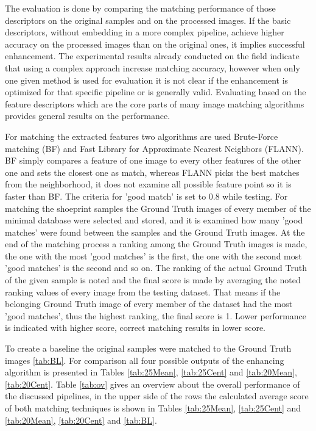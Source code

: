 \documentclass[draft,final]{vutinfth} %
\begin{document}
The evaluation is done by comparing the matching performance of those descriptors on the original samples and on the processed images.
If the basic descriptors, without embedding in a more complex pipeline, achieve higher accuracy on the processed  images than on the original ones, it implies successful enhancement.
The experimental results already conducted on the field indicate \cite{rida2019forensic} that using a complex approach increase matching accuracy, however when only one given method is used for evaluation it is not clear if the enhancement is optimized for that specific pipeline or is generally valid.
Evaluating based on the feature descriptors which are the core parts of many image matching algorithms provides general results on the performance.
\par
For matching the extracted features two algorithms are used Brute-Force matching (BF) and Fast Library for Approximate Nearest Neighbors (FLANN).
BF simply compares a feature of one image to every other features of the other one and sets the closest one as match, whereas FLANN picks the best matches from the neighborhood, it does not examine all possible feature point so it is faster than BF.
The criteria for 'good match' is set to 0.8 while testing.
For matching the shoeprint samples the Ground Truth images of every member of the minimal database were selected and stored, and it is examined how many 'good matches' were found between the samples and the Ground Truth images.
At the end of the matching process a ranking among the Ground Truth images is made, the one with the most 'good matches' is the first, the one with the second most 'good matches' is the second and so on.
The ranking of the actual Ground Truth of the given sample is noted and the final score is made by averaging the noted ranking values  of every image from the testing dataset.
That means if the belonging Ground Truth image of every member of the dataset had the most 'good matches', thus the highest ranking, the final score is 1.
Lower performance is indicated with higher score, correct matching results in lower score.
\par
To create a baseline the original samples were matched to the Ground Truth images \ref{tab:BL}.
For comparison all four possible outputs of the enhancing algorithm is presented in Tables \ref{tab:25Mean}, \ref{tab:25Cent} and \ref{tab:20Mean}, \ref{tab:20Cent}.
Table \ref{tab:ov} gives an overview about the overall performance of the discussed pipelines, in the upper side of the rows the calculated average score of both matching techniques is shown in Tables \ref{tab:25Mean}, \ref{tab:25Cent} and \ref{tab:20Mean}, \ref{tab:20Cent} and \ref{tab:BL}.
\end{document}
